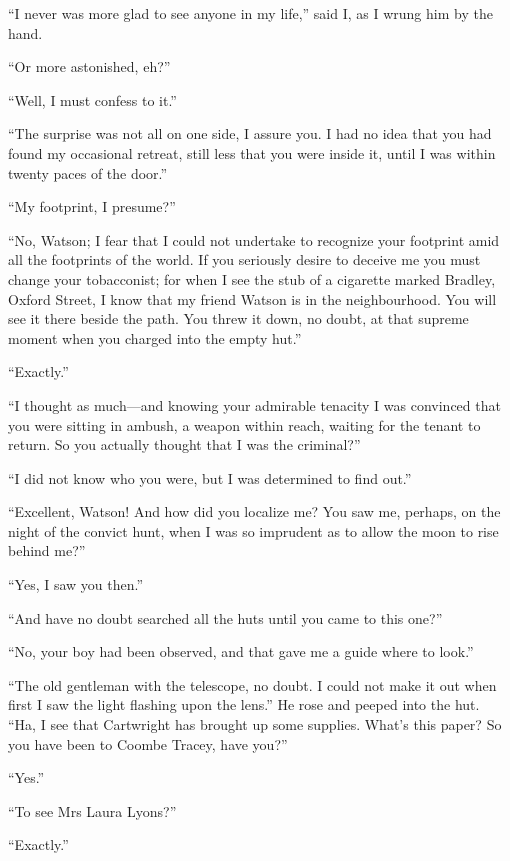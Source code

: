 \documentclass[paper=5.5in:8.5in,BCOR=7mm,twoside,DIV=calc,12pt,usegeometry,openany,chapterprefix,endperiod]{scrbook} %
\begin{document}
\enquote{I never was more glad to see anyone in my life,} said I, as I wrung him by the hand.

\enquote{Or more astonished, eh?}

\enquote{Well, I must confess to it.}

\enquote{The surprise was not all on one side, I assure you. I had no idea that you had found my occasional retreat, still less that you were inside it, until I was within twenty paces of the door.}

\enquote{My footprint, I presume?}

\enquote{No, Watson; I fear that I could not undertake to recognize your footprint amid all the footprints of the world. If you seriously desire to deceive me you must change your tobacconist; for when I see the stub of a cigarette marked Bradley, Oxford Street, I know that my friend Watson is in the neighbourhood. You will see it there beside the path. You threw it down, no doubt, at that supreme moment when you charged into the empty hut.}

\enquote{Exactly.}

\enquote{I thought as much\nobreakdash---and knowing your admirable tenacity I was convinced that you were sitting in ambush, a weapon within reach, waiting for the tenant to return. So you actually thought that I was the criminal?}

\enquote{I did not know who you were, but I was determined to find out.}

\enquote{Excellent, Watson! And how did you localize me? You saw me, perhaps, on the night of the convict hunt, when I was so imprudent as to allow the moon to rise behind me?}

\enquote{Yes, I saw you then.}

\enquote{And have no doubt searched all the huts until you came to this one?}

\enquote{No, your boy had been observed, and that gave me a guide where to look.}

\enquote{The old gentleman with the telescope, no doubt. I could not make it out when first I saw the light flashing upon the lens.} He rose and peeped into the hut. \enquote{Ha, I see that Cartwright has brought up some supplies. What's this paper? So you have been to Coombe Tracey, have you?}

\enquote{Yes.}

\enquote{To see Mrs Laura Lyons?}

\enquote{Exactly.}
\end{document}
